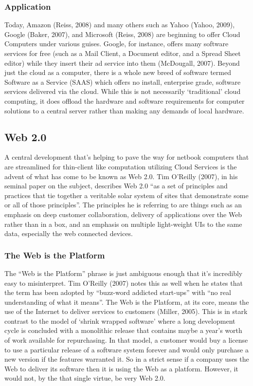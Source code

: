 \documentclass[12pt,oneside,letterpaper]{article}
\begin{document}
\subsubsection{Application}

Today, Amazon (Reiss, 2008) and many others such as Yahoo (Yahoo, 2009), Google
(Baker, 2007), and Microsoft (Reiss, 2008) are beginning to offer Cloud
Computers under various guises.  Google, for instance, offers many software
services for free (such as a Mail Client, a Document editor, and a Spread Sheet
editor) while they insert their ad service into them (McDougall, 2007).  Beyond
just the cloud as a computer, there is a whole new breed of software termed
Software as a Service (SAAS) which offers no install, enterprise grade, software
services delivered via the cloud.  While this is not necessarily `traditional'
cloud computing, it does offload the hardware and software requirements for
computer solutions to a central server rather than making any demands of local
hardware.

\subsection{Web 2.0}

A central development that's helping to pave the way for netbook computers that
are streamlined for thin-client like computation utilizing Cloud Services is the
advent of what has come to be known as Web 2.0.  Tim O'Reilly (2007), in his
seminal paper on the subject, describes Web 2.0 ``as a set of principles and
practices that tie together a veritable solar system of sites that demonstrate
some or all of those principles''. The principles he is referring to are things
such as an emphasis on deep customer collaboration, delivery of applications
over the Web rather than in a box, and an emphasis on multiple light-weight UIs
to the same data, especially the web connected devices.

\subsubsection{The Web is the Platform}

The ``Web is the Platform'' phrase is just ambiguous enough that it's incredibly
easy to misinterpret.  Tim O'Reilly (2007) notes this as well when he states
that the term has been adopted by ``buzz-word addicted start-ups'' with ``no
real understanding of what it means''.  The Web is the Platform, at its core,
means the use of the Internet to deliver services to customers (Miller, 2005).
This is in stark contrast to the model of `shrink wrapped software' where a long
development cycle is concluded with a monolithic release that contains maybe a
year's worth of work available for repurchasing.  In that model, a customer
would buy a license to use a particular release of a software system forever and
would only purchase a new version if the features warranted it.  So in a strict
sense if a company uses the Web to deliver its software then it is using the Web
as a platform.  However, it would not, by the that single virtue, be very Web
2.0.
\end{document}
